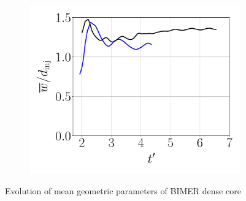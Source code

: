 \begin{figure}[ht]
\begin{subfigure}[b]{0.3\textwidth}
	\flushleft
   \includegraphics[scale=0.225]{./part3_applications/figures_ch8_resolved/results_dense_core_modeling/convergence_mean_width}
\end{subfigure}
   \caption{Evolution of mean geometric parameters of BIMER dense core}
\label{fig:BIMER_DC_mean_parameters_convergence}
\end{figure}

